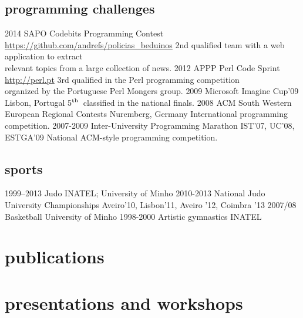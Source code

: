 \documentclass[a4paper]{friggeri-cv}
\begin{document}
\subsection{programming challenges}{}
\begin{entrylist}
  \entry
    {2014}
    {SAPO Codebits Programming Contest}
    {\href{https://github.com/andrefs/policias\_beduinos}{https://github.com/andrefs/policias\_beduinos}}
    {2nd qualified team with a web application to extract\\
    relevant topics from a large collection of news.}
  \entry
    {2012}
    {APPP Perl Code Sprint}
    {\href{http://perl.pt}{http://perl.pt}}
    {3rd qualified in the Perl programming competition\\organized by the Portuguese Perl Mongers group.}
  \entry
    {2009}
    {Microsoft Imagine Cup'09}
    {Lisbon, Portugal}
    {5$^{\footnotesize\textrm{th}}$~classified in the national finals.}
  \entry
    {2008}
    {ACM South Western European Regional Contests}
    {Nuremberg, Germany}
    {International programming competition.}
  \entry
    {2007-2009}
    {Inter-University Programming Marathon}
    {IST'07, UC'08, ESTGA'09}
    {National ACM-style programming competition.}
\end{entrylist}

\subsection{sports}{}
\begin{entrylist}
  \entry
    {1999--2013}
    {Judo}
    {INATEL; University of Minho}
    {\vspace{-.8cm}}
  \entry
    {2010-2013}
    {National Judo University Championships}
    {Aveiro'10, Lisbon'11, Aveiro '12, Coimbra '13}
    {\vspace{-.8cm}}
  \entry
    {2007/08}
    {Basketball}
    {University of Minho}
    {\vspace{-.8cm}}
  \entry
    {1998-2000}
    {Artistic gymnastics}
    {INATEL}
    {}
\end{entrylist}

\newpage
\section{publications}

\begin{refsection}
  \nocite{*}
  \printbibliography[type=inproceedings, title={peer-reviewed conferences/proceedings}, heading=subbibliography]
\end{refsection}


\section{presentations and workshops}
\begin{refsection}
  \nocite{*}
  \printbibliography[type=misc, title={presentations}, heading=none]
\end{refsection}
\end{document}
